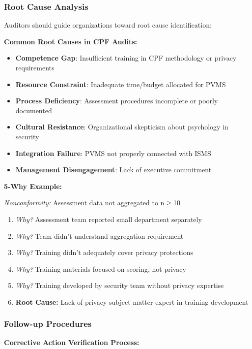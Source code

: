 \documentclass[11pt,a4paper]{article}
\begin{document}
\subsubsection{Root Cause Analysis}

Auditors should guide organizations toward root cause identification:

\textbf{Common Root Causes in CPF Audits:}

\begin{itemize}
\item \textbf{Competence Gap}: Insufficient training in CPF methodology or privacy requirements
\item \textbf{Resource Constraint}: Inadequate time/budget allocated for PVMS
\item \textbf{Process Deficiency}: Assessment procedures incomplete or poorly documented
\item \textbf{Cultural Resistance}: Organizational skepticism about psychology in security
\item \textbf{Integration Failure}: PVMS not properly connected with ISMS
\item \textbf{Management Disengagement}: Lack of executive commitment
\end{itemize}

\textbf{5-Why Example:}

\textit{Nonconformity:} Assessment data not aggregated to n$\geq$10

\begin{enumerate}
\item \textit{Why?} Assessment team reported small department separately
\item \textit{Why?} Team didn't understand aggregation requirement
\item \textit{Why?} Training didn't adequately cover privacy protections
\item \textit{Why?} Training materials focused on scoring, not privacy
\item \textit{Why?} Training developed by security team without privacy expertise
\item \textbf{Root Cause:} Lack of privacy subject matter expert in training development
\end{enumerate}

\subsubsection{Follow-up Procedures}

\textbf{Corrective Action Verification Process:}
\end{document}
